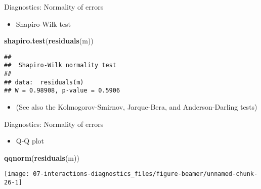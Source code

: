 \documentclass[
  ignorenonframetext,
]{beamer}
\newenvironment{Shaded}{\begin{snugshade}}{\end{snugshade}}
\newcommand{\FunctionTok}[1]{\textcolor[rgb]{0.13,0.29,0.53}{\textbf{#1}}}
\newcommand{\NormalTok}[1]{#1}
\providecommand{\tightlist}{%
  \setlength{\itemsep}{0pt}\setlength{\parskip}{0pt}}
\newcommand{\setsep}{\setlength{\itemsep}{3pt}}
\newcommand{\setskip}{\setlength{\parskip}{3pt}}
\renewcommand{\tightlist}{\setsep\setskip}
\begin{document}
\begin{frame}[fragile]{Diagnostics: Normality of errors}
\protect\hypertarget{diagnostics-normality-of-errors}{}
\pause

\begin{itemize}[<+->]
\tightlist
\item
  Shapiro-Wilk test
\end{itemize}

\begin{Shaded}
\begin{Highlighting}[]
\FunctionTok{shapiro.test}\NormalTok{(}\FunctionTok{residuals}\NormalTok{(m))}
\end{Highlighting}
\end{Shaded}

\begin{verbatim}
## 
##  Shapiro-Wilk normality test
## 
## data:  residuals(m)
## W = 0.98908, p-value = 0.5906
\end{verbatim}

\begin{itemize}[<+->]
\tightlist
\item
  (See also the Kolmogorov-Smirnov, Jarque-Bera, and Anderson-Darling tests)
\end{itemize}
\end{frame}

\begin{frame}[fragile]{Diagnostics: Normality of errors}
\protect\hypertarget{diagnostics-normality-of-errors-1}{}
\begin{itemize}[<+->]
\tightlist
\item
  Q-Q plot
\end{itemize}

\begin{Shaded}
\begin{Highlighting}[]
\FunctionTok{qqnorm}\NormalTok{(}\FunctionTok{residuals}\NormalTok{(m))}
\end{Highlighting}
\end{Shaded}

\texttt{[image: 07-interactions-diagnostics\_files/figure-beamer/unnamed-chunk-26-1]}
\end{frame}
\end{document}
